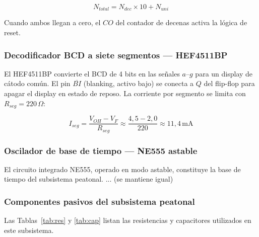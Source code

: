 \documentclass[journal]{IEEEtran}
\begin{document}
\begin{equation}
    N_{total} = N_{dec} \times 10 + N_{uni}
    \label{eq:bcd}
\end{equation}

Cuando ambos llegan a cero, el $CO$ del contador de decenas activa la lógica de reset.

\subsubsection{Decodificador BCD a siete segmentos — HEF4511BP}

El HEF4511BP convierte el BCD de 4 bits en las señales $a$--$g$ para un display de
cátodo común. El pin $\overline{BI}$ (blanking, activo bajo) se conecta a $Q$ del
flip-flop para apagar el display en estado de reposo. La corriente por segmento se
limita con $R_{seg} = 220\,\Omega$:

\begin{equation}
    I_{seg} = \frac{V_{OH} - V_F}{R_{seg}} \approx \frac{4{,}5 - 2{,}0}{220}
            \approx 11{,}4\,\text{mA}
    \label{eq:iseg}
\end{equation}

\subsubsection{Oscilador de base de tiempo — NE555 astable}
El circuito integrado NE555, operado en modo astable, constituye la base de tiempo del
subsistema peatonal. ... (se mantiene igual)


\subsubsection{Componentes pasivos del subsistema peatonal}

Las Tablas~\ref{tab:res} y \ref{tab:cap} listan las resistencias y capacitores
utilizados en este subsistema.
\end{document}
